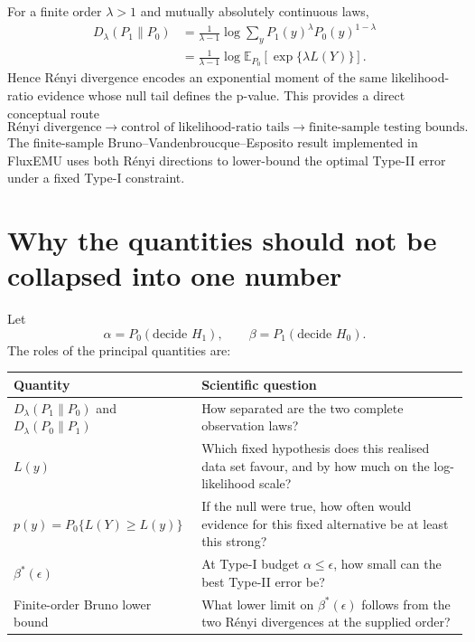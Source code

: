 \documentclass[11pt]{article}
\newcommand{\Renyi}[1]{D_{#1}}
\newcommand{\Pnull}{P_0}
\newcommand{\Palt}{P_1}
\newcommand{\E}{\mathbb{E}}
\begin{document}
For a finite order $\lambda>1$ and mutually absolutely continuous laws,
\begin{align}
\Renyi{\lambda}(\Palt\|\Pnull)
&=\frac{1}{\lambda-1}
\log\sum_y \Palt(y)^\lambda\Pnull(y)^{1-\lambda}\\
&=\frac{1}{\lambda-1}
\log\E_{\Pnull}\!\left[\exp\{\lambda L(Y)\}\right].
\end{align}
Hence Rényi divergence encodes an exponential moment of the same
likelihood-ratio evidence whose null tail defines the p-value. This provides a
direct conceptual route
\begin{equation}
\boxed{
\text{Rényi divergence}
\longrightarrow
\text{control of likelihood-ratio tails}
\longrightarrow
\text{finite-sample testing bounds}.
}
\end{equation}
The finite-sample Bruno--Vandenbroucque--Esposito result implemented in
FluxEMU uses both Rényi directions to lower-bound the optimal Type-II error
under a fixed Type-I constraint.

\section{Why the quantities should not be collapsed into one number}

Let
\begin{equation}
\alpha=P_0(\text{decide }H_1),
\qquad
\beta=P_1(\text{decide }H_0).
\end{equation}
The roles of the principal quantities are:

\begin{center}
\begin{tabular}{p{}p{}}
\toprule
Quantity & Scientific question \\
\midrule
$D_\lambda(P_1\|P_0)$ and $D_\lambda(P_0\|P_1)$
& How separated are the two complete observation laws? \\
$L(y)$
& Which fixed hypothesis does this realised data set favour, and by how much on the log-likelihood scale? \\
$p(y)=P_0\{L(Y)\ge L(y)\}$
& If the null were true, how often would evidence for this fixed alternative be at least this strong? \\
$\beta^*(\epsilon)$
& At Type-I budget $\alpha\le\epsilon$, how small can the best Type-II error be? \\
Finite-order Bruno lower bound
& What lower limit on $\beta^*(\epsilon)$ follows from the two Rényi divergences at the supplied order? \\
\bottomrule
\end{tabular}
\end{center}
\end{document}
